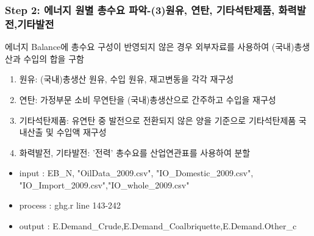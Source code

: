 \documentclass[10pt,compress,slidetop,%
			   hyperref={unicode},xcolor={svgnames},%
			   t]{beamer}
\begin{document}
%
\begin{frame}
	\frametitle{Step 2: 에너지 원별 총수요 파악-(3)원유, 연탄, 기타석탄제품, 화력발전,기타발전}
	\bigskip
	에너지 Balance에 총수요 구성이 반영되지 않은 경우 외부자료를 사용하여 (국내)총생산과 수입의 합을 구함
	\bigskip
	\begin{enumerate}
	\item{원유: (국내)총생산 원유, 수입 원유, 재고변동을 각각 재구성 }

	\item{연탄: 가정부문 소비 무연탄을 (국내)총생산으로 간주하고 수입을 재구성}
	
	\item{기타석탄제품: 유연탄 중 발전으로 전환되지 않은 양을 기준으로 기타석탄제품 국내산출 및 수입액 재구성}

	\item{화력발전, 기타발전: '전력' 총수요를 산업연관표를 사용하여 분할}
	\end{enumerate}
\begin{itemize}
\item{input : EB\_N, "OilData\_2009.csv", "IO\_Domestic\_2009.csv", "IO\_Import\_2009.csv","IO\_whole\_2009.csv"}
\item{process : ghg.r line 143-242}
\item{output : E.Demand\_Crude,E.Demand\_Coalbriquette,E.Demand.Other\_c}
\end{itemize} 		
\end{frame}
%
\end{document}
